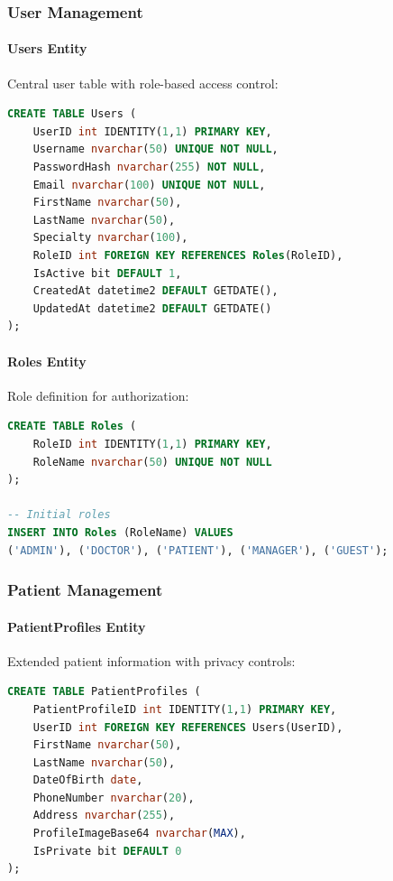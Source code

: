\documentclass[12pt,a4paper]{article}
\begin{document}
\subsubsection{User Management}

\paragraph{Users Entity}
Central user table with role-based access control:

\begin{lstlisting}[language=SQL]
CREATE TABLE Users (
    UserID int IDENTITY(1,1) PRIMARY KEY,
    Username nvarchar(50) UNIQUE NOT NULL,
    PasswordHash nvarchar(255) NOT NULL,
    Email nvarchar(100) UNIQUE NOT NULL,
    FirstName nvarchar(50),
    LastName nvarchar(50),
    Specialty nvarchar(100),
    RoleID int FOREIGN KEY REFERENCES Roles(RoleID),
    IsActive bit DEFAULT 1,
    CreatedAt datetime2 DEFAULT GETDATE(),
    UpdatedAt datetime2 DEFAULT GETDATE()
);
\end{lstlisting}

\paragraph{Roles Entity}
Role definition for authorization:

\begin{lstlisting}[language=SQL]
CREATE TABLE Roles (
    RoleID int IDENTITY(1,1) PRIMARY KEY,
    RoleName nvarchar(50) UNIQUE NOT NULL
);

-- Initial roles
INSERT INTO Roles (RoleName) VALUES 
('ADMIN'), ('DOCTOR'), ('PATIENT'), ('MANAGER'), ('GUEST');
\end{lstlisting}

\subsubsection{Patient Management}

\paragraph{PatientProfiles Entity}
Extended patient information with privacy controls:

\begin{lstlisting}[language=SQL]
CREATE TABLE PatientProfiles (
    PatientProfileID int IDENTITY(1,1) PRIMARY KEY,
    UserID int FOREIGN KEY REFERENCES Users(UserID),
    FirstName nvarchar(50),
    LastName nvarchar(50),
    DateOfBirth date,
    PhoneNumber nvarchar(20),
    Address nvarchar(255),
    ProfileImageBase64 nvarchar(MAX),
    IsPrivate bit DEFAULT 0
);
\end{lstlisting}
\end{document}
